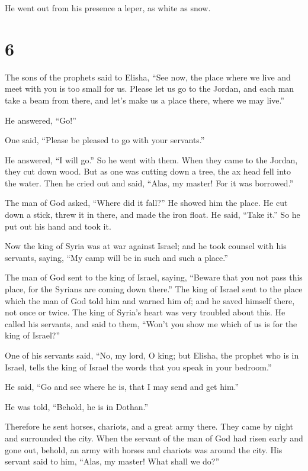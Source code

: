 He went out from his presence a leper, as white as snow.

\hypertarget{section-5}{%
\section{6}\label{section-5}}

 The sons of the prophets said to Elisha, ``See now, the
place where we live and meet with you is too small for us. 
Please let us go to the Jordan, and each man take a beam from there, and
let's make us a place there, where we may live.''

He answered, ``Go!''

 One said, ``Please be pleased to go with your servants.''

He answered, ``I will go.''  So he went with them. When they
came to the Jordan, they cut down wood.  But as one was
cutting down a tree, the ax head fell into the water. Then he cried out
and said, ``Alas, my master! For it was borrowed.''

 The man of God asked, ``Where did it fall?'' He showed him
the place. He cut down a stick, threw it in there, and made the iron
float.  He said, ``Take it.'' So he put out his hand and
took it.

 Now the king of Syria was at war against Israel; and he
took counsel with his servants, saying, ``My camp will be in such and
such a place.''

 The man of God sent to the king of Israel, saying, ``Beware
that you not pass this place, for the Syrians are coming down there.''
 The king of Israel sent to the place which the man of God
told him and warned him of; and he saved himself there, not once or
twice.  The king of Syria's heart was very troubled about
this. He called his servants, and said to them, ``Won't you show me
which of us is for the king of Israel?''

 One of his servants said, ``No, my lord, O king; but
Elisha, the prophet who is in Israel, tells the king of Israel the words
that you speak in your bedroom.''

 He said, ``Go and see where he is, that I may send and get
him.''

He was told, ``Behold, he is in Dothan.''

 Therefore he sent horses, chariots, and a great army
there. They came by night and surrounded the city.  When
the servant of the man of God had risen early and gone out, behold, an
army with horses and chariots was around the city. His servant said to
him, ``Alas, my master! What shall we do?''


